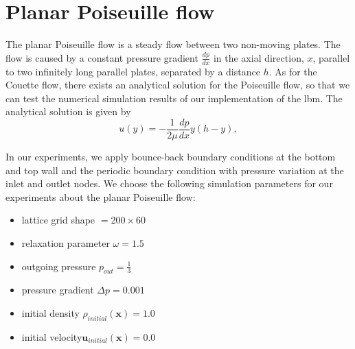 \documentclass[a4paper,11pt, footsepline]{book}
\begin{document}
\section{Planar Poiseuille flow}\label{sec-pouseuille}
The planar Poiseuille flow is a steady flow between two non-moving plates. The flow is caused by a constant pressure gradient $\frac{dp}{dx}$ in the axial direction, $x$, parallel to two infinitely long parallel plates, separated by a distance $h$.
As for the Couette flow, there exists an analytical solution for the Poiseuille flow, so that we can test the numerical simulation results of our implementation of the \ac{lbm}. The analytical solution is given by
\begin{equation}
\label{eq:poiseuilleEq}
u(y)=-\frac{1}{2\mu}\frac{dp}{dx}y(h-y),
\end{equation} 

In our experiments, we apply bounce-back boundary conditions at the bottom and top wall and the periodic boundary condition with pressure variation at the inlet and outlet nodes.
We choose the following simulation parameters for our experiments about the planar Poiseuille flow:
\begin{itemize}
\setlength\itemsep{0.15em}
\item lattice grid shape $=200\times 60$
\item relaxation parameter $\omega=1.5$
\item outgoing pressure $p_{out}=\frac{1}{3}$
\item pressure gradient $\Delta p=0.001$
\item initial density $\rho_{initial}(\mathbf{x})=1.0$
\item initial velocity$\mathbf{u}_{initial}(\mathbf{x})=0.0$
\end{itemize}
\end{document}
